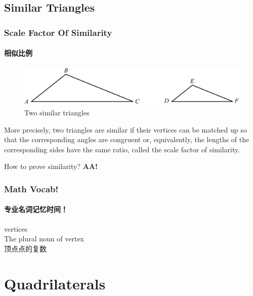 \documentclass[
	11pt, %
	handout,
]{beamer}
\begin{document}

\subsection{Similar Triangles}


\begin{frame}
	\frametitle{Scale Factor Of Similarity} %
	\framesubtitle{相似比例}
		\begin{figure}
			\includegraphics[width=0.8\linewidth]{Scale_Factor.jpg}
			\caption{Two similar triangles}
		\end{figure}
			\begin{definition}
				More precisely, two triangles are similar if their
vertices can be matched up so that the corresponding angles are congruent or,
equivalently, the lengths of the corresponding sides have the same ratio,
called \alert{the scale factor of similarity}.
			\end{definition}
How to prove similarity? \pause \alert{\textbf{AA!}}
\end{frame}


\begin{frame}
	\frametitle{Math Vocab!} %
	\framesubtitle{专业名词记忆时间！}
	
	{\Huge vertices}\\

		\bigskip\bigskip
	{\LARGE The plural noun of vertex \\ 
	顶点点的复数}

\end{frame}


\section{Quadrilaterals}

\end{document}
